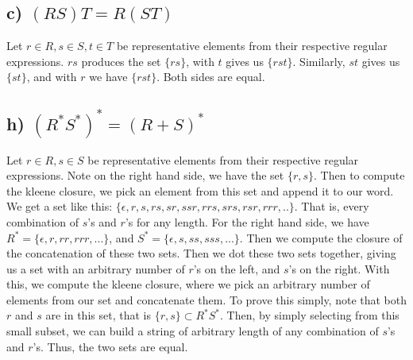 \documentclass[20pt]{article} %
\begin{document}
\subsection{c) $(RS)T=R(ST)$}
Let $r \in R, s \in S, t \in T$ be representative elements from their respective regular expressions. $rs$ produces the set $\{rs\}$, with $t$ gives us $\{rst\}$.  Similarly, $st$ gives us $\{st\}$, and with $r$ we have $\{rst\}$.  Both sides are equal.

\subsection{h) $(R^{*}S^{*})^{*}=(R+S)^{*}$}
Let $r \in R, s \in S$ be representative elements from their respective regular expressions.  Note on the right hand side, we have the set $\{r,s\}$.  Then to compute the kleene closure, we pick an element from this set and append it to our word.  We get a set like this: $\{\epsilon, r, s, rs, sr, ssr, rrs, srs, rsr, rrr, ..\}$. That is, every combination of $s$'s and $r$'s for any length. For the right hand side, we have $R^{*} = \{\epsilon, r, rr, rrr, ...\}$, and $S^{*} = \{\epsilon, s, ss, sss, ...\}$. Then we compute the closure of the concatenation of these two sets. Then we dot these two sets together, giving us a set with an arbitrary number of $r$'s on the left, and $s$'s on the right.  With this, we compute the kleene closure, where we pick an arbitrary number of elements from our set and concatenate them.  To prove this simply, note that both $r$ and $s$ are in this set, that is $\{r,s\} \subset R^{*}S^{*}$. Then, by simply selecting from this small subset, we can build a string of arbitrary length of any combination of $s$'s and $r$'s.  Thus, the two sets are equal.
\end{document}
